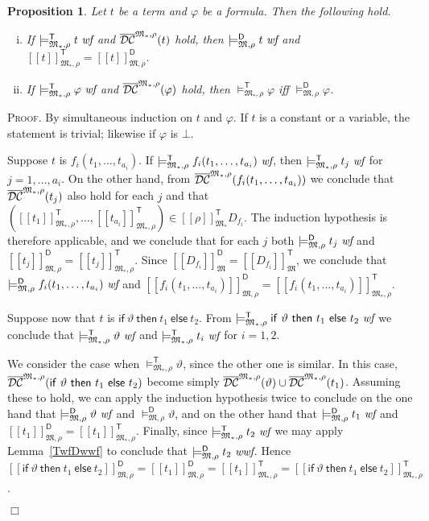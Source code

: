 \documentclass{article}
\newtheorem{proposition}[definition]{Proposition}
\newenvironment{proof}{\smallskip\textsc{Proof.}}{\hspace*{\fill}$\Box$}
\newcommand{\ifthelse}[3]{\ensuremath{\mathsf{if}\ {#1}\ \mathsf{then}\ {#2}\ \mathsf{else}\ {#3}}}
\newcommand{\modelfunm}[1]{\ensuremath{\mathfrak{#1}_\ast}}
\newcommand{\modelfun}[1]{\ensuremath{{#1}_\ast}}
\newcommand{\wf}{\ \mbox{\em wf}}
\newcommand{\wwf}{\ \mbox{\em wwf}}
\newcommand{\intm}[3]{\ensuremath{[\![{#3}]\!]^{\mathsf{#1}}_{\mathfrak{#2}}}}
\newcommand{\ints}[4]{\ensuremath{[\![{#4}]\!]^{\mathsf{#1}}_{\mathfrak{#2},{#3}}}}
\newcommand{\mymodelss}[3]{\ensuremath{\models_{\mathfrak{#2},{#3}}^{\mathsf{#1}}}}
\newcommand{\semDC}[2][{\mathfrak M},\rho]{\ensuremath{\overline{\cal{DC}}^{#1}_{#2}}}
\newcommand{\semDCa}[1]{\semDC[{\modelfunm M,\rho}]{#1}}
\begin{document}
\begin{proposition}\label{TintDint}
Let $t$ be a term and $\varphi$ be a formula.  Then the following hold.
\begin{enumerate}[(i)]
\item If $\mymodelss{T}{\modelfun M}\rho t\wf$ and $\semDCa{}(t)$
hold, then $\mymodelss{D}M\rho t\wf$ and
$\ints{T}{\modelfun M}\rho t=\ints{D}M\rho t$.
\item If $\mymodelss{T}{\modelfun M}\rho\varphi\wf$ and $\semDCa{}(\varphi)$
hold, then $\mymodelss{T}{\modelfun M}\rho\varphi$
iff $\mymodelss{D}{M}\rho\varphi$.
\end{enumerate}
\end{proposition}
\begin{proof}
By simultaneous induction on $t$ and $\varphi$.  If $t$ is a constant or a
variable, the statement is trivial; likewise if $\varphi$ is $\bot$.

Suppose $t$ is $f_i(t_1,\ldots,t_{a_i})$.  If
$\mymodelss{T}{\modelfun M}\rho f_i(t_1,\ldots,t_{a_i})\wf$, then
$\mymodelss{T}{\modelfun M}\rho t_j\wf$ for $j=1,\ldots,a_i$.
On the other hand, from $\semDCa{}(f_i(t_1,\ldots,t_{a_i}))$ we conclude
that $\semDCa{}(t_j)$ also hold for each $j$ and that
$(\ints{T}{\modelfun M}\rho{t_1},\ldots,\ints{T}{\modelfun M}\rho{t_{a_i}})\in\intm{T}{\modelfun M}\rho{D_{f_i}}$.
The induction hypothesis is therefore applicable, and we conclude that
for each $j$ both $\mymodelss{D}M\rho t_j\wf$ and
$\ints{D}M\rho{t_j}=\ints{T}{\modelfun M}\rho{t_j}$.  Since
$\intm{D}M{D_{f_i}}=\intm{T}M{D_{f_i}}$, we conclude that
$\mymodelss{D}M\rho f_i(t_1,\ldots,t_{a_i})\wf$ and
$\ints{D}M\rho{f_i(t_1,\ldots,t_{a_i})}=\ints{T}{\modelfun M}\rho{f_i(t_1,\ldots,t_{a_i})}$.

Suppose now that $t$ is $\ifthelse\vartheta{t_1}{t_2}$.  From
$\mymodelss{T}{\modelfun M}\rho\ifthelse\vartheta{t_1}{t_2}\wf$ we
conclude that $\mymodelss{T}{\modelfun M}\rho\vartheta\wf$ and
$\mymodelss{T}{\modelfun M}\rho t_i\wf$ for $i=1,2$.

We consider the case when $\mymodelss{T}{\modelfun M}\rho\vartheta$,
since the other one is similar.  In this case,
$\semDCa{}(\ifthelse\vartheta{t_1}{t_2})$ become simply
$\semDCa{}(\vartheta)\cup\semDCa{}(t_1)$.  Assuming these to hold, we
can apply the induction hypothesis twice to conclude on the one hand
that $\mymodelss{D}M\rho\vartheta\wf$ and $\mymodelss{D}M\rho\vartheta$,
and on the other hand that $\mymodelss{D}M\rho t_1\wf$ and
$\ints{D}M\rho{t_1}=\ints{T}{\modelfun M}\rho{t_1}$.  Finally, since
$\mymodelss{T}{\modelfun M}\rho{t_2}\wf$ we may apply Lemma~\ref{TwfDwwf}
to conclude that $\mymodelss{D}M\rho t_2\wwf$.  Hence
$\ints{D}M\rho{\ifthelse\vartheta{t_1}{t_2}}=\ints{D}M\rho{t_1}=%
\ints{T}{\modelfun M}\rho{t_1}=%
\ints{T}{\modelfun M}\rho{\ifthelse\vartheta{t_1}{t_2}}$.


\end{proof}
\end{document}
